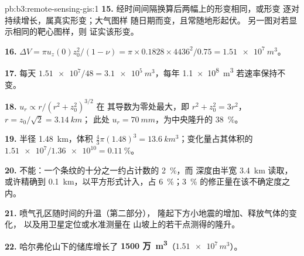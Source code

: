 \begin{solution}{pb:b3:remote-sensing-gis:1}
\textbf{15.} 经时间间隔换算后两幅上的形变相同，或形变
逐对持续增长，属真实形变；大气图样
随日期而变，且常随地形起伏。
另一图对若显示相同的靶心图样，则
证实该形变。

\textbf{16.} $\Delta V = \pi u_z(0)z_0^2/(1 - \nu) = \pi\times0.1828\times
4436^2/0.75 = \qty{1.51e7}{m^3}$。

\textbf{17.} 每天 $\num{1.51e7}/48 = \qty{3.1e5}{m^3}$，每年 \qty{1.1e8}{m^3}
若速率保持不变。

\textbf{18.} $u_r \propto r/(r^2 + z_0^2)^{3/2}$ 在
其导数为零处最大，即 $r^2 + z_0^2 = 3r^2$，$r = z_0/\sqrt2 = \qty{3.14}{km}$；
此处 $u_r = \qty{70}{mm}$，为中央隆升的 \qty{38}{\percent}。

\textbf{19.} 半径 \qty{1.48}{km}，体积 $\frac43\pi(1.48)^3 =
\qty{13.6}{km^3}$；变化量占其体积的 $\num{1.51e7}/\num{1.36e10} =
\qty{0.11}{\percent}$。

\textbf{20.} 不能：一个条纹的十分之一约占计数的 \qty{2}{\percent}，而
深度由半宽 \qty{3.4}{km} 读取，或许精确到
\qty{0.1}{km}，以平方形式计入，占 \qty{6}{\percent}；\qty{3}{\percent}
的修正量在该不确定度之内。

\textbf{21.} 喷气孔区随时间的升温（第二部分），
隆起下方小地震的增加、释放气体的变化，
以及用卫星定位或水准测量在
山坡上的若干点测得的隆升。

\textbf{22.} 哈尔弗伦山下的储库增长了
\textbf{1500 万~\unit[text-series-to-math=true]{m^3}}（$\num{1.51e7}\,\unit{m^3}$）。
\end{solution}
